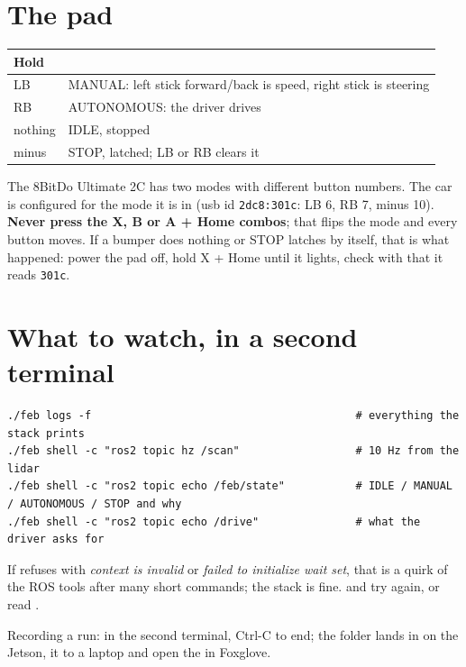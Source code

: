\documentclass[11pt,a4paper]{article}
\begin{document}
\section{The pad}

\begin{tabularx}{\linewidth}{lX}
\toprule
Hold & \\
\midrule
LB & MANUAL: left stick forward/back is speed, right stick is steering \\
RB & AUTONOMOUS: the driver drives \\
nothing & IDLE, stopped \\
minus & STOP, latched; LB or RB clears it \\
\bottomrule
\end{tabularx}

\medskip
The 8BitDo Ultimate 2C has two modes with different button numbers. The car is configured for the mode it is in
(usb id \texttt{2dc8:301c}: LB 6, RB 7, minus 10). \textbf{Never press the X, B or A + Home combos}; that flips
the mode and every button moves. If a bumper does nothing or STOP latches by itself, that is what happened:
power the pad off, hold X + Home until it lights, check with  that it reads
\texttt{301c}.

\section{What to watch, in a second terminal}

\begin{lstlisting}
./feb logs -f                                         # everything the stack prints
./feb shell -c "ros2 topic hz /scan"                  # 10 Hz from the lidar
./feb shell -c "ros2 topic echo /feb/state"           # IDLE / MANUAL / AUTONOMOUS / STOP and why
./feb shell -c "ros2 topic echo /drive"               # what the driver asks for
\end{lstlisting}

If  refuses with \emph{context is invalid} or \emph{failed to initialize wait set}, that is a
quirk of the ROS tools after many short commands; the stack is fine.  and try again,
or read .

Recording a run:  in the second terminal, Ctrl-C to end; the folder
lands in  on the Jetson,  it to a laptop and open the 
in Foxglove.
\end{document}
